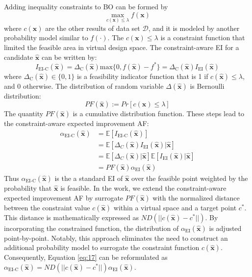 \documentclass[preprint,review,12pt,authoryear]{elsarticle}
\begin{document}
Adding inequality constraints to BO can be formed by
\begin{equation}
\max_{c(\boldsymbol{x}) \leq \lambda} f(\boldsymbol{x})
\label{eq:11}
\end{equation}
where $c(\boldsymbol{x})$ are the other results of data set $\mathcal{D}$, and it is modeled by another probability model similar to $f(\cdot)$. The $c(\boldsymbol{x})\leq \lambda$ is a constraint function that limited the feasible area in virtual design space. The constraint-aware EI for a candidate $\hat{\boldsymbol{x}}$ can be written by:
\begin{equation}
I_{\text{EI-C}}(\hat{\boldsymbol{x}})=\Delta_\text{C}(\hat{\boldsymbol{x}})\text{max}\{0, f(\hat{\boldsymbol{x}})-f^*\}=\Delta_\text{C}(\hat{\boldsymbol{x}})I_{\text{EI}}(\hat{\boldsymbol{x}})
    \label{eq:12}
\end{equation}
where $\Delta_\text{C}(\hat{\boldsymbol{x}})\in \{0,1\}$ is a feasibility indicator function that is 1 if $c(\hat{\boldsymbol{x}})\leq \lambda$, and 0 otherwise. 
The distribution of random variable $\Delta(\hat{\boldsymbol{x}})$ is Bernoulli distribution:
\begin{equation}
    PF(\hat{\boldsymbol{x}}):=Pr[c(\boldsymbol{x})\leq \lambda] 
    \label{eq:13}
\end{equation}
The quantity $PF(\hat{\boldsymbol{x}})$ is a cumulative distribution function. These steps lead to the  constraint-aware expected improvement AF:
\begin{equation}
\begin{aligned}
\alpha_{\text{EI-C}}(\hat{\boldsymbol{x}}) &=\mathbb{E}[I_\text{EI-C}(\hat{\boldsymbol{x}})]\\
&= \mathbb{E}[\Delta_{C}(\hat{\boldsymbol{x}})I_{\text{EI}}(\hat{\boldsymbol{x}})|\hat{\boldsymbol{x}}]\\
&= \mathbb{E}[\Delta_{C}(\hat{\boldsymbol{x}})|\hat{\boldsymbol{x}}]\mathbb{E}[I_\text{EI}(\hat{\boldsymbol{x}})|\hat{\boldsymbol{x}}]\\
&=PF(\hat{\boldsymbol{x}})\alpha_{\text{EI}}(\hat{\boldsymbol{x}})
\end{aligned}
\label{eq:14}
\end{equation}
Thus $\alpha_{\text{EI-C}}(\hat{\boldsymbol{x}})$ is the a standard EI of $\hat{\boldsymbol{x}}$ over the feasible point weighted by the probability that $\hat{\boldsymbol{x}}$ is feasible. In the work, we extend the constraint-aware expected improvement AF by surrogate $PF(\hat{\boldsymbol{x}})$ with the normalized distance between the constraint value $c(\hat{\boldsymbol{x}})$ within a virtual space and a target point $c^*$. This distance is mathematically expressed as $ND(||c(\hat{\boldsymbol{x}})-c^*||)$. By incorporating the constrained function, the distribution of \(\alpha_{\text{EI}}(\hat{\boldsymbol{x}})\) is adjusted point-by-point. Notably, this approach eliminates the need to construct an additional probability model to surrogate the constraint function $c(\hat{\boldsymbol{x}}) $. Consequently, Equation \ref{eq:17} can be reformulated as $\alpha_{\text{EI-C}}(\hat{\boldsymbol{x}}) =ND(||c(\hat{\boldsymbol{x}})-c^*||)\alpha_{\text{EI}}(\hat{\boldsymbol{x}})
$. 
\end{document}
